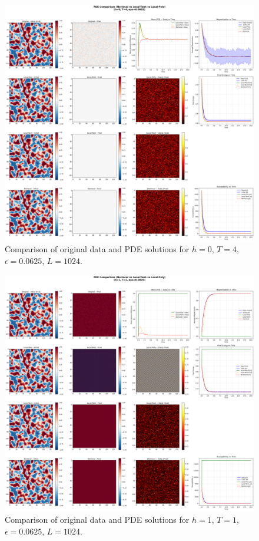 \documentclass[11pt,a4paper]{article}
\begin{document}
\begin{figure}[!h]
    \centering
    \includegraphics[width=1.0\textwidth]{fig/compare_pde_solvers_L1024_h0_T4_eps0.0625.png}
    \caption{Comparison of original data and PDE solutions for $h=0$, $T=4$, $\epsilon=0.0625$, $L=1024$.}
    \label{fig:pde_comparison_h0_T4_eps0.0625}
\end{figure}

\begin{figure}[!h]
    \centering
    \includegraphics[width=1.0\textwidth]{fig/compare_pde_solvers_L1024_h1_T1_eps0.0625.png}
    \caption{Comparison of original data and PDE solutions for $h=1$, $T=1$, $\epsilon=0.0625$, $L=1024$.}
    \label{fig:pde_comparison_h1_T1_eps0.0625}
\end{figure}
\end{document}
